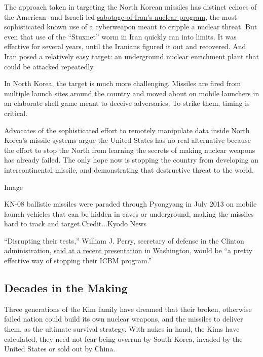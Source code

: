 The approach taken in targeting the North Korean missiles has distinct
echoes of the American- and Israeli-led
\href{http://www.nytimes.com/2011/01/16/world/middleeast/16stuxnet.html}{sabotage
of Iran's nuclear program}, the most sophisticated known use of a
cyberweapon meant to cripple a nuclear threat. But even that use of the
``Stuxnet'' worm in Iran quickly ran into limits. It was effective for
several years, until the Iranians figured it out and recovered. And Iran
posed a relatively easy target: an underground nuclear enrichment plant
that could be attacked repeatedly.

In North Korea, the target is much more challenging. Missiles are fired
from multiple launch sites around the country and moved about on mobile
launchers in an elaborate shell game meant to deceive adversaries. To
strike them, timing is critical.

Advocates of the sophisticated effort to remotely manipulate data inside
North Korea's missile systems argue the United States has no real
alternative because the effort to stop the North from learning the
secrets of making nuclear weapons has already failed. The only hope now
is stopping the country from developing an intercontinental missile, and
demonstrating that destructive threat to the world.

Image

KN-08 ballistic missiles were paraded through Pyongyang in July 2013 on
mobile launch vehicles that can be hidden in caves or underground,
making the missiles hard to track and target.Credit...Kyodo News

``Disrupting their tests,'' William J. Perry, secretary of defense in
the Clinton administration,
\href{http://38north.org/wp-content/uploads/2017/01/2017-0109-38-North-Press-Briefing-Transcript.pdf}{said
at a recent presentation} in Washington, would be ``a pretty effective
way of stopping their ICBM program.''

\hypertarget{decades-in-the-making}{%
\subsection{Decades in the Making}\label{decades-in-the-making}}

Three generations of the Kim family have dreamed that their broken,
otherwise failed nation could build its own nuclear weapons, and the
missiles to deliver them, as the ultimate survival strategy. With nukes
in hand, the Kims have calculated, they need not fear being overrun by
South Korea, invaded by the United States or sold out by China.

